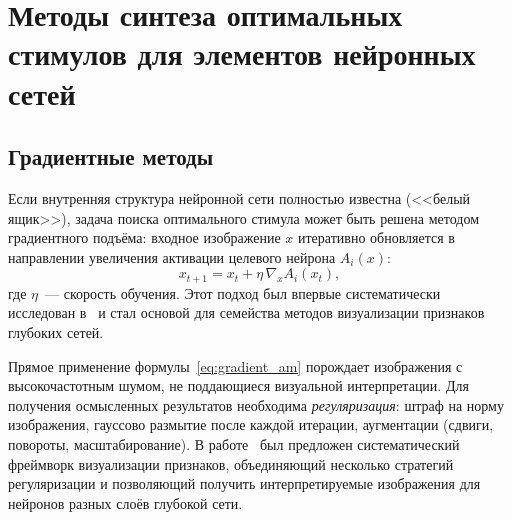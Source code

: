 
\section{Методы синтеза оптимальных стимулов для элементов нейронных сетей}\label{sec:lit_stimuli}


\subsection{Градиентные методы}\label{sec:gradient_am}

Если внутренняя структура нейронной сети полностью известна (<<белый ящик>>), задача поиска оптимального стимула может быть решена методом градиентного подъёма: входное изображение $x$ итеративно обновляется в направлении увеличения активации целевого нейрона $A_i(x)$:
\begin{equation}\label{eq:gradient_am}
    x_{t+1} = x_t + \eta\,\nabla_x A_i(x_t),
\end{equation}
где $\eta$~--- скорость обучения. Этот подход был впервые систематически исследован в~\cite{erhan2009visualizing} и стал основой для семейства методов визуализации признаков глубоких сетей.

Прямое применение формулы~\eqref{eq:gradient_am} порождает изображения с высокочастотным шумом, не поддающиеся визуальной интерпретации. Для получения осмысленных результатов необходима \textit{регуляризация}: штраф на норму изображения, гауссово размытие после каждой итерации, аугментации (сдвиги, повороты, масштабирование). В работе~\cite{Olah2017} был предложен систематический фреймворк визуализации признаков, объединяющий несколько стратегий регуляризации и позволяющий получить интерпретируемые изображения для нейронов разных слоёв глубокой сети.


